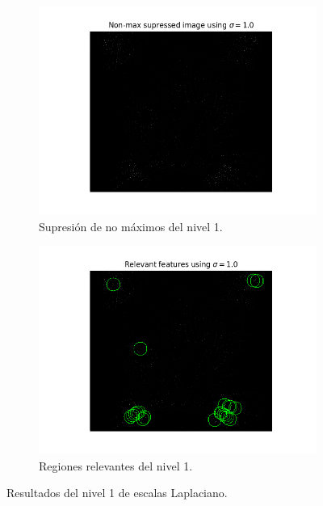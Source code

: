 \documentclass[11pt,a4paper]{article}
\begin{document}
\begin{figure}[H]
\begin{subfigure}{.5\linewidth}
	\centering
	\includegraphics[scale=0.5]{img/non-max1.png}
	\caption{Supresión de no máximos del nivel 1.}
	\label{fig:non-max1}
\end{subfigure}
\begin{subfigure}{.5\linewidth}
	\centering
	\includegraphics[scale=0.5]{img/features1.png}
	\caption{Regiones relevantes del nivel 1.}
	\label{fig:features1}
\end{subfigure}
\caption{Resultados del nivel 1 de escalas Laplaciano.}
\label{fig:lap-scale-space1}
\end{figure}
\end{document}
